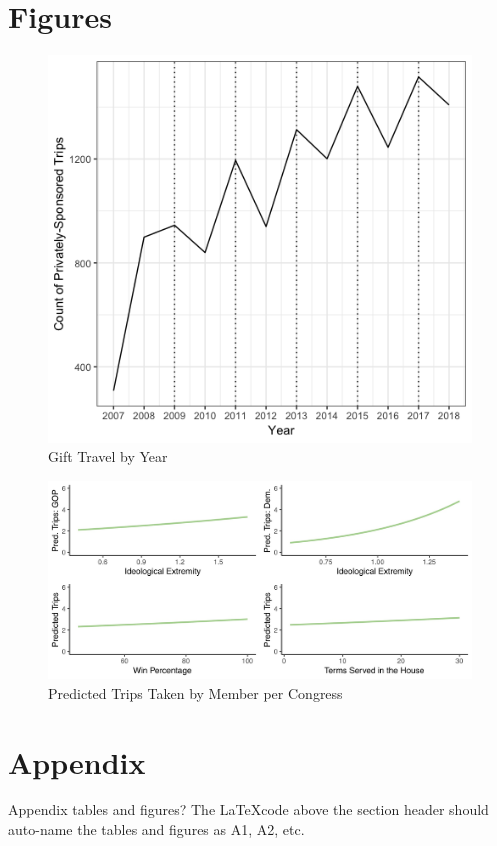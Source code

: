 \documentclass[12pt]{article}                           %
\begin{document}
\section*{\centering Figures}
\begin{figure}[hbt]
\centering
\includegraphics[scale=.55]{trend.png}
  \caption{Gift Travel by Year}
\end{figure}

\begin{figure}[hbt]
\centering
\includegraphics[scale=.21]{fig1.jpeg}
  \caption{Predicted Trips Taken by Member per Congress}
\end{figure}

\newpage
\clearpage
\setcounter{table}{0}
\renewcommand{\thetable}{A\arabic{table}}
\setcounter{page}{1}
\section*{\centering Appendix}

Appendix tables and figures? The \LaTeX code above the section header should auto-name the tables and figures as A1, A2, etc.
\end{document}
